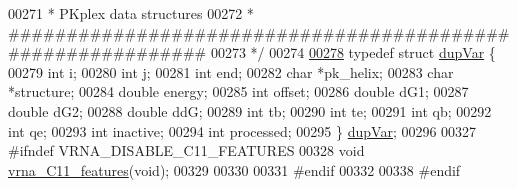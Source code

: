 \begin{DoxyCode}
00271 \textcolor{comment}{ * PKplex data structures}
00272 \textcolor{comment}{ * ############################################################}
00273 \textcolor{comment}{ */}
00274 
\hyperlink{group__data__structures}{00278} \textcolor{keyword}{typedef} \textcolor{keyword}{struct }\hyperlink{group__data__structures_structdupVar}{dupVar} \{
00279   \textcolor{keywordtype}{int}     i;
00280   \textcolor{keywordtype}{int}     j;
00281   \textcolor{keywordtype}{int}     end;
00282   \textcolor{keywordtype}{char}    *pk\_helix;
00283   \textcolor{keywordtype}{char}    *structure;
00284   \textcolor{keywordtype}{double}  energy;
00285   \textcolor{keywordtype}{int}     offset;
00286   \textcolor{keywordtype}{double}  dG1;
00287   \textcolor{keywordtype}{double}  dG2;
00288   \textcolor{keywordtype}{double}  ddG;
00289   \textcolor{keywordtype}{int}     tb;
00290   \textcolor{keywordtype}{int}     te;
00291   \textcolor{keywordtype}{int}     qb;
00292   \textcolor{keywordtype}{int}     qe;
00293   \textcolor{keywordtype}{int}     inactive;
00294   \textcolor{keywordtype}{int}     processed;
00295 \} \hyperlink{group__data__structures_gabd3b93f9aaa9f3acce2d148bae97d24e}{dupVar};
00296 
00327 \textcolor{preprocessor}{#ifndef VRNA\_DISABLE\_C11\_FEATURES}
00328 \textcolor{keywordtype}{void} \hyperlink{group__data__structures_ga21744ae2d6a17309f9327d3547cef0cb}{vrna\_C11\_features}(\textcolor{keywordtype}{void});
00329 
00330 
00331 \textcolor{preprocessor}{#endif}
00332 
00338 \textcolor{preprocessor}{#endif}
\end{DoxyCode}
